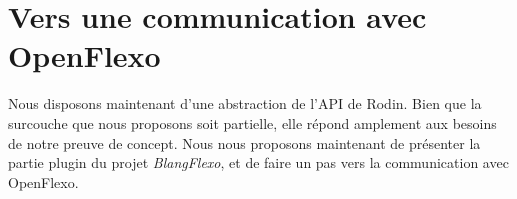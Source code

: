 \section*{Vers une communication avec OpenFlexo}

Nous disposons maintenant d'une abstraction de l'API de Rodin.
Bien que la surcouche que nous proposons soit partielle, elle répond amplement aux besoins de notre preuve de concept.
Nous nous proposons maintenant de présenter la partie plugin du projet \textit{BlangFlexo}, et de faire un pas vers la communication avec OpenFlexo.
